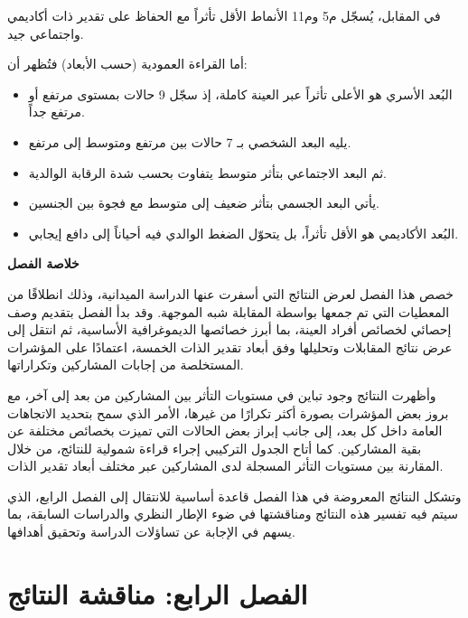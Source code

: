 \documentclass[12pt,oneside]{report}
\begin{document}
في المقابل، يُسجّل م5 وم11 الأنماط الأقل تأثراً مع الحفاظ على تقدير ذات أكاديمي واجتماعي جيد.

أما القراءة العمودية (حسب الأبعاد) فتُظهر أن:

\begin{itemize}[leftmargin=1.6em,itemsep=1pt]
\item البُعد الأسري هو الأعلى تأثراً عبر العينة كاملة، إذ سجّل 9 حالات بمستوى مرتفع أو مرتفع جداً.
\item يليه البعد الشخصي بـ 7 حالات بين مرتفع ومتوسط إلى مرتفع.
\item ثم البعد الاجتماعي بتأثر متوسط يتفاوت بحسب شدة الرقابة الوالدية.
\item يأتي البعد الجسمي بتأثر ضعيف إلى متوسط مع فجوة بين الجنسين.
\item البُعد الأكاديمي هو الأقل تأثراً، بل يتحوّل الضغط الوالدي فيه أحياناً إلى دافع إيجابي.
\end{itemize}
\noindent\textbf{خلاصة الفصل}\par
خصص هذا الفصل لعرض النتائج التي أسفرت عنها الدراسة الميدانية، وذلك انطلاقًا من المعطيات التي تم جمعها بواسطة المقابلة شبه الموجهة. وقد بدأ الفصل بتقديم وصف إحصائي لخصائص أفراد العينة، بما أبرز خصائصها الديموغرافية الأساسية، ثم انتقل إلى عرض نتائج المقابلات وتحليلها وفق أبعاد تقدير الذات الخمسة، اعتمادًا على المؤشرات المستخلصة من إجابات المشاركين وتكراراتها.

وأظهرت النتائج وجود تباين في مستويات التأثر بين المشاركين من بعد إلى آخر، مع بروز بعض المؤشرات بصورة أكثر تكرارًا من غيرها، الأمر الذي سمح بتحديد الاتجاهات العامة داخل كل بعد، إلى جانب إبراز بعض الحالات التي تميزت بخصائص مختلفة عن بقية المشاركين. كما أتاح الجدول التركيبي إجراء قراءة شمولية للنتائج، من خلال المقارنة بين مستويات التأثر المسجلة لدى المشاركين عبر مختلف أبعاد تقدير الذات.

وتشكل النتائج المعروضة في هذا الفصل قاعدة أساسية للانتقال إلى الفصل الرابع، الذي سيتم فيه تفسير هذه النتائج ومناقشتها في ضوء الإطار النظري والدراسات السابقة، بما يسهم في الإجابة عن تساؤلات الدراسة وتحقيق أهدافها.

\chapter*{الفصل الرابع: مناقشة النتائج}
\end{document}
